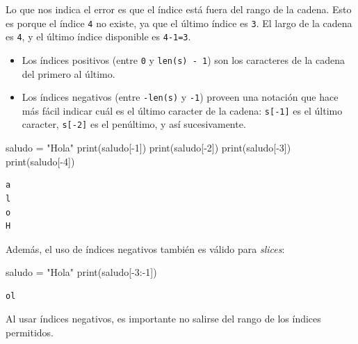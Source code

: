 \documentclass[
  letterpaper,
  DIV=11,
  numbers=noendperiod]{scrreprt}
\newenvironment{Shaded}{\begin{snugshade}}{\end{snugshade}}
\newcommand{\BuiltInTok}[1]{\textcolor[rgb]{0.00,0.23,0.31}{#1}}
\newcommand{\DecValTok}[1]{\textcolor[rgb]{0.68,0.00,0.00}{#1}}
\newcommand{\NormalTok}[1]{\textcolor[rgb]{0.00,0.23,0.31}{#1}}
\newcommand{\OperatorTok}[1]{\textcolor[rgb]{0.37,0.37,0.37}{#1}}
\newcommand{\StringTok}[1]{\textcolor[rgb]{0.13,0.47,0.30}{#1}}
\providecommand{\tightlist}{%
  \setlength{\itemsep}{0pt}\setlength{\parskip}{0pt}}\usepackage{longtable,booktabs,array}
\begin{document}
\begin{tcolorbox}
Lo que nos indica el error es que el índice está fuera del rango de la
cadena. Esto es porque el índice \texttt{4} no existe, ya que el último
índice es \texttt{3}. El largo de la cadena es \texttt{4}, y el último
índice disponible es \texttt{4-1=3}.

\begin{itemize}
\tightlist
\item
  Los índices positivos (entre \texttt{0} y \texttt{len(s)\ -\ 1}) son
  los caracteres de la cadena del primero al último.
\item
  Los índices negativos (entre \texttt{-len(s)} y \texttt{-1}) proveen
  una notación que hace más fácil indicar cuál es el último caracter de
  la cadena: \texttt{s{[}-1{]}} es el último caracter,
  \texttt{s{[}-2{]}} es el penúltimo, y así sucesivamente.
\end{itemize}

\begin{Shaded}
\begin{Highlighting}[]
\NormalTok{saludo }\OperatorTok{=} \StringTok{"Hola"}
\BuiltInTok{print}\NormalTok{(saludo[}\OperatorTok{{-}}\DecValTok{1}\NormalTok{])}
\BuiltInTok{print}\NormalTok{(saludo[}\OperatorTok{{-}}\DecValTok{2}\NormalTok{])}
\BuiltInTok{print}\NormalTok{(saludo[}\OperatorTok{{-}}\DecValTok{3}\NormalTok{])}
\BuiltInTok{print}\NormalTok{(saludo[}\OperatorTok{{-}}\DecValTok{4}\NormalTok{])}
\end{Highlighting}
\end{Shaded}

\begin{verbatim}
a
l
o
H
\end{verbatim}

Además, el uso de índices negativos también es válido para
\emph{slices}:

\begin{Shaded}
\begin{Highlighting}[]
\NormalTok{saludo }\OperatorTok{=} \StringTok{"Hola"}
\BuiltInTok{print}\NormalTok{(saludo[}\OperatorTok{{-}}\DecValTok{3}\NormalTok{:}\OperatorTok{{-}}\DecValTok{1}\NormalTok{])}
\end{Highlighting}
\end{Shaded}

\begin{verbatim}
ol
\end{verbatim}

Al usar índices negativos, es importante no salirse del rango de los
índices permitidos.

\end{tcolorbox}
\end{document}
